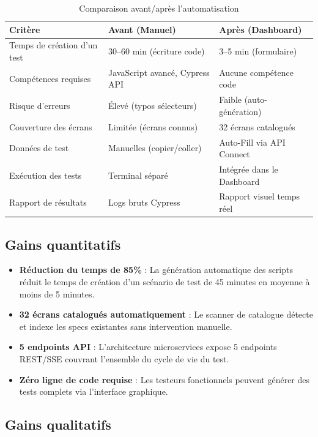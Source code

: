 \begin{table}[H]
\centering
\caption{Comparaison avant/après l'automatisation}
\renewcommand{\arraystretch}{1.4}
\begin{tabularx}{\textwidth}{l X X}
\toprule
\textbf{Critère} & \textbf{Avant (Manuel)} & \textbf{Après (Dashboard)} \\
\midrule
\rowcolor{primary!5} Temps de création d'un test & 30--60 min (écriture code) & 3--5 min (formulaire) \\
Compétences requises & JavaScript avancé, Cypress API & Aucune compétence code \\
\rowcolor{primary!5} Risque d'erreurs & Élevé (typos sélecteurs) & Faible (auto-génération) \\
Couverture des écrans & Limitée (écrans connus) & 32 écrans catalogués \\
\rowcolor{primary!5} Données de test & Manuelles (copier/coller) & Auto-Fill via API Connect \\
Exécution des tests & Terminal séparé & Intégrée dans le Dashboard \\
\rowcolor{primary!5} Rapport de résultats & Logs bruts Cypress & Rapport visuel temps réel \\
\bottomrule
\end{tabularx}
\end{table}

\subsection{Gains quantitatifs}

\begin{itemize}[leftmargin=*]
\item \textbf{Réduction du temps de 85\%} : La génération automatique des scripts réduit le temps de création d'un scénario de test de 45 minutes en moyenne à moins de 5 minutes.
\item \textbf{32 écrans catalogués automatiquement} : Le scanner de catalogue détecte et indexe les specs existantes sans intervention manuelle.
\item \textbf{5 endpoints API} : L'architecture microservices expose 5 endpoints REST/SSE couvrant l'ensemble du cycle de vie du test.
\item \textbf{Zéro ligne de code requise} : Les testeurs fonctionnels peuvent générer des tests complets via l'interface graphique.
\end{itemize}

\subsection{Gains qualitatifs}

